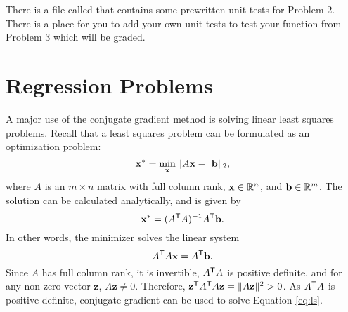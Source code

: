 \begin{unittest}
There is a file called  that contains some prewritten unit tests for Problem 2.
There is a place for you to add your own unit tests to test your function from Problem 3 which will be graded.
\end{unittest}

\section*{Regression Problems} %

A major use of the conjugate gradient method is solving linear least squares problems.
Recall that a least squares problem can be formulated as an optimization problem:
\[
\mathbf{x}^* = \min_{\mathbf{x}} \|A\mathbf{x} -\textbf{ b}\|_2,
\]
where $A$ is an $m \times n$ matrix with full column rank, $\mathbf{x} \in \mathbb{R}^n$, and $\mathbf{b} \in \mathbb{R}^m$. The solution can
be calculated analytically, and is given by
\[
\mathbf{x}^* = (A^{\mathsf T} A)^{-1}A^{\mathsf T} \mathbf{b}.
\]
In other words, the minimizer solves the linear system
\begin{equation}
A^{\mathsf T} A\mathbf{x} = A^{\mathsf T} \mathbf{b}.
\label{eq:ls}
\end{equation}
Since $A$ has full column rank, it is invertible, $A^{\mathsf T} A$ is positive definite, and for any non-zero vector $\textbf{z}$, $A\textbf{z}\neq 0$.
Therefore, $\textbf{z}^{\mathsf T} A^{\mathsf T} A\textbf{z} = \Vert A\textbf{z} \Vert^2 > 0$.
As $A^{\mathsf T} A$ is positive definite, conjugate gradient can be used to solve Equation \ref{eq:ls}.

